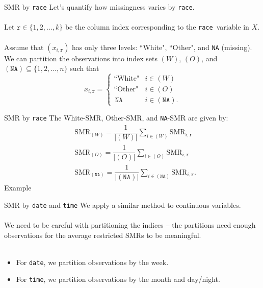 \documentclass[11pt]{beamer}
\newcommand{\SMR}{\mathrm{SMR}}
\newcommand{\race}{\texttt{race}}
\newcommand{\rrr}{\texttt{r}}
\begin{document}
\begin{frame}{SMR by \race}
    Let's quantify how missingness varies by \race. 
    \\~\\
    Let $\rrr \in \{ 1, 2, \ldots, k \}$ be the column index corresponding to the \race \,  variable in $X$. 
    \\~\\
    Assume that $(x_{i, \rrr})$ has only three levels: ``White", ``Other", and \texttt{NA} (missing). We can partition the observations into index sets $(W)$, $(O)$, and $(\texttt{NA}) \subseteq \{1, 2, \ldots, n\}$ such that
    \begin{equation*}
    x_{i, \rrr} =
    \begin{cases}
    	\text{``White"} & i \in (W) \\
	\text{``Other"} & i \in (O) \\
	\, \texttt{NA} & i \in (\texttt{NA}).
    \end{cases}
    \end{equation*}
\end{frame}

\begin{frame}{SMR by \race}
    The White-$\SMR$, Other-$\SMR$, and \texttt{NA}-$\SMR$ are given by:
    \begin{align*}
    &\SMR_{(W)} = \dfrac{1}{ |(W)| } \sum_{i \in (W)} \SMR_{i, \rrr} \\
    &\SMR_{(O)} = \dfrac{1}{ |(O)| } \sum_{i \in (O)} \SMR_{i, \rrr} \\
    &\SMR_{(\texttt{NA})} = \dfrac{1}{ |(\texttt{NA})| } \sum_{i \in (\texttt{NA})} \SMR_{i, \rrr}.
    \end{align*}
    Example
\end{frame}

\begin{frame}{SMR by \texttt{date} and \texttt{time}}
	We apply a similar method to continuous variables.
	\\~\\
	We need to be careful with partitioning the indices -- the partitions need enough observations for the average restricted $\SMR$s to be meaningful.
	\\~\\ \pause
	\begin{itemize}
	\item For \texttt{date}, we partition observations by the week.
	\item For \texttt{time}, we partition observations by the month and day/night.
	\end{itemize}
	
	
	
\end{frame}
\end{document}
